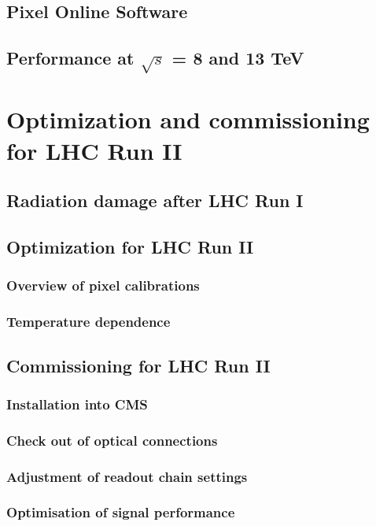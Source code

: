 \section{Pixel Online Software}

\section{Performance at $\sqrt{s}$ = 8 and 13 TeV}

\chapter{Optimization and commissioning for LHC Run II}

\section{Radiation damage after LHC Run I}
\section{Optimization for LHC Run II}
\subsection{Overview of pixel calibrations}
\subsection{Temperature dependence}

\section{Commissioning for LHC Run II}
\subsection{Installation into CMS}
\subsection{Check out of optical connections}
\subsection{Adjustment of readout chain settings}
\subsection{Optimisation of signal performance}
